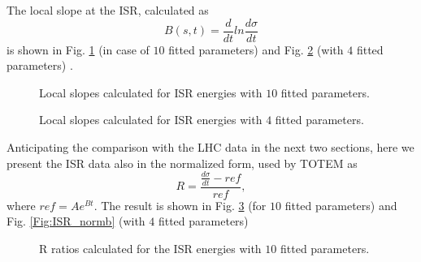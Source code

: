 \documentclass[aps,prd,superscriptaddress,showpacs,preprintnumbers]{revtex4}
\begin{document}
The local slope at the ISR, calculated as
\begin{equation}
B(s,t)=\frac{d}{dt}ln\frac{d\sigma}{dt}
\end{equation}
is shown in Fig. \ref{Fig:ISR_slopea} (in case of $10$ fitted parameters) and Fig. \ref{Fig:ISR_slopeb} (with $4$ fitted parameters) .
\begin{figure}[H] 
	\centering
	\hfill
	\hfill
	\hfill
	\hfill
	
	\caption{Local slopes calculated for ISR energies \cite{ISR} with $10$ fitted parameters.}
	\label{Fig:ISR_slopea}
\end{figure}
\begin{figure}[H] 
	\centering
	\hfill
	\hfill
	\hfill
	\hfill
	
	\caption{Local slopes calculated for ISR energies \cite{ISR} with $4$ fitted parameters.}
	\label{Fig:ISR_slopeb}
\end{figure}
Anticipating the comparison with the LHC data in the next two sections, here we present the ISR data also in the normalized form, used by TOTEM as 
\begin{equation} \label{Eq:norm}
R=\frac{\frac{d\sigma}{dt}-ref}{ref},
\end{equation}
where $ref=Ae^{Bt}$. The result is shown in Fig. \ref{Fig:ISR_norma} (for $10$ fitted parameters) and Fig. \ref{Fig:ISR_normb} (with $4$ fitted parameters)
\begin{figure} 
	\centering
	\hfill
	\hfill
	\hfill
	\hfill
	
	\caption{R ratios calculated for the ISR \cite{ISR} energies with $10$ fitted parameters.}
	\label{Fig:ISR_norma}
\end{figure}
\end{document}

